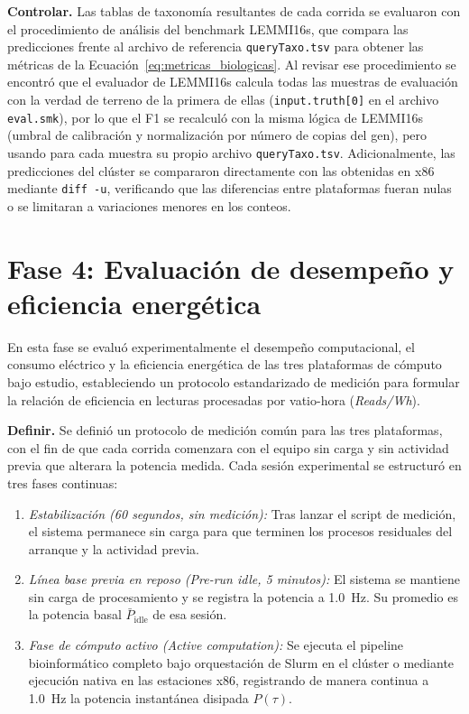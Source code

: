 \documentclass[12pt,oneside,spanish]{book}
\begin{document}
    \textbf{Controlar.} Las tablas de taxonomía resultantes de cada corrida se evaluaron con el procedimiento de análisis del benchmark LEMMI16s, que compara las predicciones frente al archivo de referencia \texttt{queryTaxo.tsv} para obtener las métricas de la Ecuación~\eqref{eq:metricas_biologicas}. Al revisar ese procedimiento se encontró que el evaluador de LEMMI16s calcula todas las muestras de evaluación con la verdad de terreno de la primera de ellas (\texttt{input.truth[0]} en el archivo \texttt{eval.smk}), por lo que el F1 se recalculó con la misma lógica de LEMMI16s (umbral de calibración y normalización por número de copias del gen), pero usando para cada muestra su propio archivo \texttt{queryTaxo.tsv}. Adicionalmente, las predicciones del clúster se compararon directamente con las obtenidas en x86 mediante \texttt{diff -u}, verificando que las diferencias entre plataformas fueran nulas o se limitaran a variaciones menores en los conteos.
    
    \section{Fase 4: Evaluación de desempeño y eficiencia energética}
    \label{sec:fase4_metodologia}
    
    En esta fase se evaluó experimentalmente el desempeño computacional, el consumo eléctrico y la eficiencia energética de las tres plataformas de cómputo bajo estudio, estableciendo un protocolo estandarizado de medición para formular la relación de eficiencia en lecturas procesadas por vatio-hora (\textit{Reads/Wh}).
    
    \textbf{Definir.} Se definió un protocolo de medición común para las tres plataformas, con el fin de que cada corrida comenzara con el equipo sin carga y sin actividad previa que alterara la potencia medida. Cada sesión experimental se estructuró en tres fases continuas:
\newpage

    \begin{enumerate}
        \item \textit{Estabilización (60 segundos, sin medición):} Tras lanzar el script de medición, el sistema permanece sin carga para que terminen los procesos residuales del arranque y la actividad previa.
        \item \textit{Línea base previa en reposo (Pre-run idle, 5 minutos):} El sistema se mantiene sin carga de procesamiento y se registra la potencia a 1.0~Hz. Su promedio es la potencia basal $\bar{P}_{\text{idle}}$ de esa sesión.
        \item \textit{Fase de cómputo activo (Active computation):} Se ejecuta el pipeline bioinformático completo bajo orquestación de Slurm en el clúster o mediante ejecución nativa en las estaciones x86, registrando de manera continua a 1.0~Hz la potencia instantánea disipada $P(\tau)$.
    \end{enumerate}
    
\end{document}
